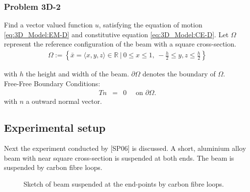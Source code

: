 \documentclass[../../main.tex]{subfiles}
\begin{document}
\subsubsection{Problem 3D-2}
Find a vector valued function $u$, satisfying the equation of motion \eqref{eq:3D_Model:EM-D} and constitutive equation \eqref{eq:3D_Model:CE-D}. Let $\Omega$ represent the reference configuration of the beam with a square cross-section.
\begin{eqnarray*}
	\Omega := \left\{ \bar{x} = \langle x,y,z \rangle \in \mathbb{R} \ | \ 0 \leq x \leq 1, \ -\frac{h}{2} \leq y, z \leq \frac{h}{2}  \right\}
\end{eqnarray*}

with $h$ the height and width of the beam. $\partial \Omega$ denotes the boundary of $\Omega$. \\

{Free-Free Boundary Conditions:}\\
\begin{eqnarray*}
	Tn & = & 0 \quad \textrm{ on } \partial\Omega.
\end{eqnarray*} with $n$ a outward normal vector.


\subsection{Experimental setup}
Next the experiment conducted by [SP06] is discussed. A short, aluminium alloy beam with near square cross-section is suspended at both ends. The beam is suspended by carbon fibre loops.

\begin{figure}[h!]
	\centering
	\caption{Sketch of beam suspended at the end-points by carbon fibre loops.}
\end{figure} 
\FloatBarrier
\end{document}
